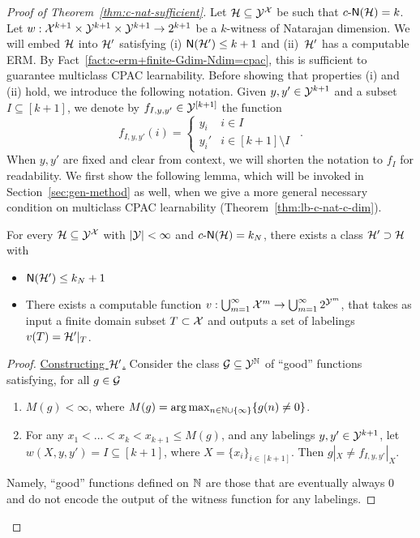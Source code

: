 \documentclass[11pt]{article}
\begin{document}
\begin{proof}[Proof of Theorem~\ref{thm:c-nat-sufficient}]
    Let $\mathcal{H}\subseteq\mathcal{Y}^{\mathcal{X}}$ be such that $c\text{-}\mathsf{N}(\mathcal{H})=k$.
    Let $w:\mathcal{X}^{k+1}\times\mathcal{Y}^{k+1}\times\mathcal{Y}^{k+1}\rightarrow 2^{k+1}$  be a $k$-witness of Natarajan dimension.
    We will embed $\mathcal{H}$ into $\mathcal{H}'$ satisfying (i) $\mathsf{N}(\mathcal{H}')\leq k+1$ and (ii)~$\mathcal{H}'$ has a computable ERM. 
    By Fact~\ref{fact:c-erm+finite-Gdim-Ndim=cpac}, this is sufficient to guarantee multiclass CPAC learnability.
%
    Before showing that properties (i) and (ii) hold, we introduce the following notation.
    Given $y,y'\in\mathcal{Y}^{k+1}$ and a subset $I\subseteq[k+1]$, we denote by $f_{I,y,y'}\in\mathcal{Y}^{[k+1]}$ the function 
    \begin{equation}
    \label{eqn:f_I}
        f_{I,y,y'}(i) = 
        \begin{cases}
            y_i & i\in I \\
            y_i' & i\in[k+1]\setminus I
        \end{cases}
        \enspace.
    \end{equation}
    When $y,y'$ are fixed and clear from context, we will shorten the notation to $f_I$ for readability. 
We first show the following lemma, which will be invoked in Section~\ref{sec:gen-method} as well, when we give a more general necessary condition on multiclass CPAC learnability (Theorem~\ref{thm:lb-c-nat-c-dim}).
\begin{lemma}\label{lemma:embedding}
    For every $\mathcal{H}\subseteq\mathcal{Y}^{\mathcal{X}}$ with $|\mathcal{Y}|<\infty$ and $c\text{-}\mathsf{N}(\mathcal{H}) = k_N$, there exists a class $\mathcal{H}' \supset \mathcal{H}$ with 
    \begin{itemize}
        \item $\mathsf{N}(\mathcal{H}') \leq k_N +1$
        \item There exists a computable function $v: \bigcup_{m=1}^{\infty }\mathcal{X}^m \to \bigcup_{m=1}^{\infty } 2^{\mathcal{Y}^m}$, that takes as input a finite domain subset $T\subset \mathcal{X}$ and outputs a set of labelings $v(T) = \mathcal{H}'|_T$. 
    \end{itemize}
\end{lemma}

\begin{proof}
    \underline{Constructing $\mathcal{H}'$.} 
    Consider the class $\mathcal{G}\subseteq\mathcal{Y}^{\mathbb{N}}$ of ``good'' functions satisfying, for all $g\in\mathcal{G}$
    \begin{enumerate}
        \item $ M(g)<\infty$, where $M(g)=\arg\max_{n\in\mathbb{N}\cup\{\infty\}}\{ g(n)\neq0 \}$.
        \item For any $x_1<\dots<x_k<x_{k+1}\leq M(g)$, and any labelings $y,y'\in\mathcal{Y}^{k+1}$, let $w(X,y,y')=I\subseteq[k+1]$, where $X=\{x_i\}_{i\in[k+1]}$. Then $g|_X\neq f_{I,y,y'}|_X$.
    \end{enumerate}
   Namely, ``good'' functions defined on $\mathbb{N}$ are those that are eventually always 0 and do not encode the output of the witness function for any labelings.
    

\end{proof}
\end{proof}
\end{document}

